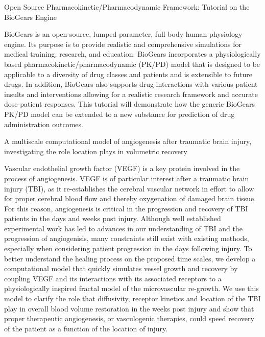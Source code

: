   \cventry
    {Open Source Pharmacokinetic/Pharmacodynamic Framework: Tutorial on the BioGears Engine} %
    {} %
    {} %
    {} %
     {
    \begin{cvitems} %
    \item {BioGears is an open-source, lumped parameter, full-body human physiology engine. Its purpose is to provide realistic and comprehensive simulations for medical training, research, and education. BioGears incorporates a physiologically based pharmacokinetic/pharmacodynamic (PK/PD) model that is designed to be applicable to a diversity of drug classes and patients and is extensible to future drugs. In addition, BioGears also supports drug interactions with various patient insults and interventions allowing for a realistic research framework and accurate dose-patient responses. This tutorial will demonstrate how the generic BioGears PK/PD model can be extended to a new substance for prediction of drug administration outcomes.}
    \end{cvitems}
     }

  \cventry
    {A multiscale computational model of angiogenesis after traumatic brain injury, investigating the role location plays in volumetric recovery} %
    {} %
    {} %
    {} %
     {
    \begin{cvitems} %
    \item {Vascular endothelial growth factor (VEGF) is a key protein involved in the process of angiogenesis. VEGF is of particular interest after a traumatic brain injury (TBI), as it re-establishes the cerebral vascular network in effort to allow for proper cerebral blood flow and thereby oxygenation of damaged brain tissue. For this reason, angiogenesis is critical in the progression and recovery of TBI patients in the days and weeks post injury. Although well established experimental work has led to advances in our understanding of TBI and the progression of angiogenisis, many constraints still exist with existing methods, especially when considering patient progression in the days following injury. To better understand the healing process on the proposed time scales, we develop a computational model that quickly simulates vessel growth and recovery by coupling VEGF and its interactions with its associated receptors to a physiologically inspired fractal model of the microvascular re-growth. We use this model to clarify the role that diffusivity, receptor kinetics and location of the TBI play in overall blood volume restoration in the weeks post injury and show that proper therapeutic angiogenesis, or vasculogenic therapies, could speed recovery of the patient as a function of the location of injury.}
    \end{cvitems}
     }

